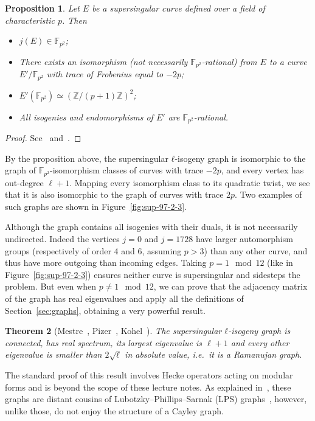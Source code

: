 \documentclass[10pt]{article}
\theoremstyle{plain}
\newtheorem{theorem}{Theorem}
\newtheorem{proposition}[theorem]{Proposition}
\theoremstyle{definition}
\def\F{\ensuremath{\mathbb{F}}}
\begin{document}
\begin{proposition}
  Let $E$ be a supersingular curve defined over a field of
  characteristic $p$. %
  Then
  \begin{itemize}
  \item $j(E) \in \F_{p^2}$;
  \item There exists an isomorphism (not necessarily
    $\F_{p^2}$-rational) from $E$ to a curve $E'/\F_{p^2}$ with trace
    of Frobenius equal to $-2p$;
  \item $E'(\F_{p^2}) ≃ (ℤ/(p+1)ℤ)^2$;
  \item All isogenies and endomorphisms of $E'$ are
    $\F_{p^2}$-rational.
  \end{itemize}
\end{proposition}
\begin{proof}
  See~\cite[Lectures~13--14]{sutherland-notes}
  and~\cite[\S~4]{waterhouse69}.
\end{proof}

By the proposition above, the supersingular $ℓ$-isogeny graph is
isomorphic to the graph of $\F_{p^2}$-isomorphism classes of curves
with trace $-2p$, and every vertex has out-degree $\ell+1$. %
Mapping every isomorphism class to its quadratic twist, we see that it
is also isomorphic to the graph of curves with trace $2p$. %
Two examples of such graphs are shown in
Figure~\ref{fig:sup-97-2-3}. %

Although the graph contains all isogenies with their duals, it is not
necessarily undirected. %
Indeed the vertices $j=0$ and $j=1728$ have larger automorphism groups
(respectively of order 4 and 6, assuming $p > 3$) than any other
curve, and thus have more outgoing than incoming edges. %
Taking $p = 1 \mod 12$ (like in Figure~\ref{fig:sup-97-2-3}) ensures
neither curve is supersingular and sidesteps the problem. %
But even when $p ≠ 1 \mod 12$, we can prove that the adjacency matrix
of the graph has real eigenvalues and apply all the definitions of
Section~\ref{sec:graphs}, obtaining a very powerful result.

\begin{theorem}[Mestre~\cite{mestre86}, Pizer~\cite{pizer1,pizer2}, Kohel~\cite{kohel}]
  \label{th:ss-exp}
  The supersingular $ℓ$-isogeny graph is connected, has real spectrum,
  its largest eigenvalue is $\ell+1$ and every other eigenvalue is
  smaller than $2\sqrt{ℓ}$ in absolute value, i.e.\ it is a Ramanujan
  graph.
\end{theorem}

The standard proof of this result involves Hecke operators acting on
modular forms and is beyond the scope of these lecture notes. %
As explained in~\cite{EPRINT:CFLMP18}, these graphs are distant
cousins of Lubotzky--Phillips--Sarnak (LPS) graphs~\cite{LubPS,Lub},
however, unlike those, do not enjoy the structure of a Cayley graph. %
\end{document}
